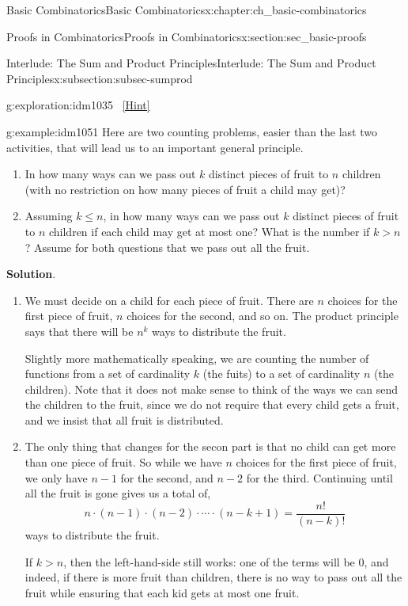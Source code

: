 \documentclass[oneside,10pt,]{book}
\numberwithin{equation}{chapter}
\newcommand{\gt}{>}
\begin{document}
\begin{chapterptx}{Basic Combinatorics}{}{Basic Combinatorics}{}{}{x:chapter:ch_basic-combinatorics}
\begin{sectionptx}{Proofs in Combinatorics}{}{Proofs in Combinatorics}{}{}{x:section:sec_basic-proofs}
\begin{subsectionptx}{Interlude: The Sum and Product Principles}{}{Interlude: The Sum and Product Principles}{}{}{x:subsection:subsec-sumprod}
\begin{exploration}{}{g:exploration:idm1035}
\qquad~\hfill{\tiny\hyperlink{g:hint:idm1041-back}{[Hint]}}\end{exploration}
\begin{example}{}{g:example:idm1051}%
Here are two counting problems, easier than the last two activities, that will lead us to an important general principle.%
\begin{enumerate}
\item{}In how many ways can we pass out \(k\) distinct pieces of fruit to \(n\) children (with no restriction on how many pieces of fruit a child may get)?%
\item{}Assuming \(k\le n\), in how many ways can we pass out \(k\) distinct pieces of fruit to \(n\) children if each child may get at most one? What is the number if \(k \gt n\)? Assume for both questions that we pass out all the fruit.%
\end{enumerate}
%
\par\smallskip%
\noindent\textbf{Solution}.\hypertarget{g:solution:idm1065}{}\quad{}%
\begin{enumerate}
\item{}We must decide on a child for each piece of fruit.  There are \(n\) choices for the first piece of fruit, \(n\) choices for the second, and so on.  The product principle says that there will be \(n^k\) ways to distribute the fruit.%
\par
Slightly more mathematically speaking, we are counting the number of functions from a set of cardinality \(k\) (the fuits) to a set of cardinality \(n\) (the children).  Note that it does not make sense to think of the ways we can send the children to the fruit, since we do not require that every child gets a fruit, and we insist that all fruit is distributed.%
\item{}The only thing that changes for the secon part is that no child can get more than one piece of fruit.  So while we have \(n\) choices for the first piece of fruit, we only have \(n-1\) for the second, and \(n-2\) for the third.  Continuing until all the fruit is gone gives us a total of,%
\begin{equation*}
n \cdot (n-1) \cdot (n-2) \cdot \cdots \cdot (n-k+1) = \frac{n!}{(n-k)!} 
\end{equation*}
ways to distribute the fruit.%
\par
If \(k \gt n\), then the left-hand-side still works: one of the terms will be 0, and indeed, if there is more fruit than children, there is no way to pass out all the fruit while ensuring that each kid gets at most one fruit.%

\end{enumerate}
\end{example}
\end{subsectionptx}
\end{sectionptx}
\end{chapterptx}
\end{document}
